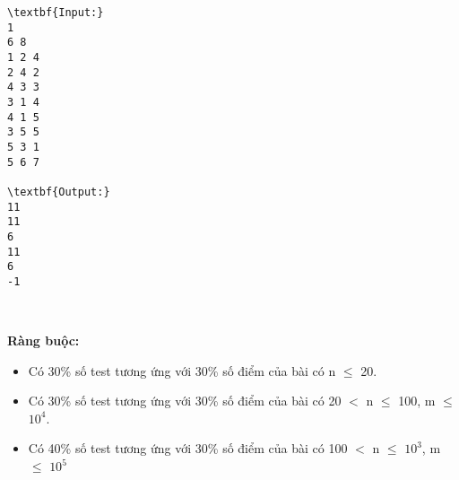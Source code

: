 \begin{verbatim}
\textbf{Input:}
1
6 8
1 2 4
2 4 2
4 3 3
3 1 4
4 1 5
3 5 5
5 3 1
5 6 7

\textbf{Output:}
11
11
6
11
6
-1\end{verbatim}

 

\textbf{Ràng buộc:}
\begin{itemize}
	\item Có 30\% số test tương ứng với 30\% số điểm của bài có n  $\le$  20.
	\item Có 30\% số test tương ứng với 30\% số điểm của bài có 20 $<$ n  $\le$  100, m  $\le$  $10^{4}$.
	\item Có 40\% số test tương ứng với 30\% số điểm của bài có 100 $<$ n  $\le$  $10^{3}$, m  $\le$  $10^{5}$
\end{itemize}
\begin{itemize}
\end{itemize}